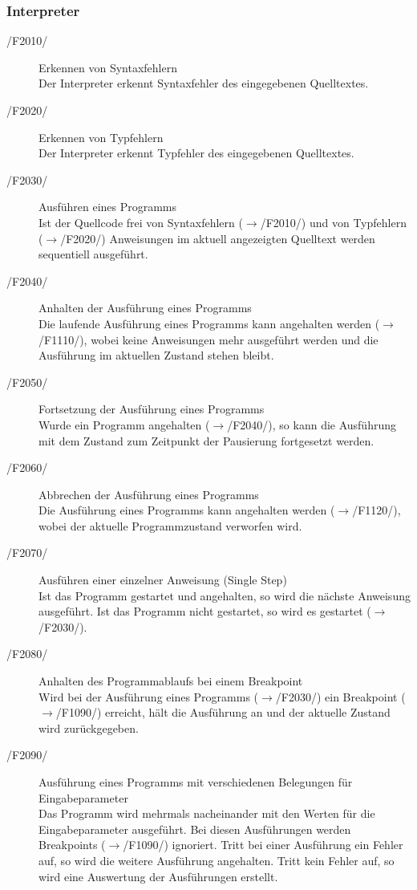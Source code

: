\documentclass[a4paper,10pt]{article}
\begin{document}
\subsubsection{Interpreter}
\begin{description}
\item[/F2010/] Erkennen von Syntaxfehlern\\
Der Interpreter erkennt Syntaxfehler des eingegebenen Quelltextes.
\item[/F2020/] Erkennen von Typfehlern\\
Der Interpreter erkennt Typfehler des eingegebenen Quelltextes.
\item[/F2030/] Ausf\"{u}hren eines Programms\\
Ist der Quellcode frei von Syntaxfehlern ($\to$/F2010/) und von Typfehlern ($\to$/F2020/) Anweisungen im aktuell angezeigten Quelltext werden sequentiell ausgef\"{u}hrt.
\item[/F2040/] Anhalten der Ausführung eines Programms\\
Die laufende Ausführung eines Programms kann angehalten werden ($\to$/F1110/), wobei keine Anweisungen mehr ausgeführt werden und die Ausführung im aktuellen Zustand stehen bleibt.
\item[/F2050/] Fortsetzung der Ausführung eines Programms\\
Wurde ein Programm angehalten ($\to$/F2040/), so kann die Ausführung mit dem Zustand zum Zeitpunkt der Pausierung fortgesetzt werden.
\item[/F2060/] Abbrechen der Ausführung eines Programms\\
Die Ausführung eines Programms kann angehalten werden ($\to$/F1120/), wobei der aktuelle Programmzustand verworfen wird.
\item[/F2070/] Ausführen einer einzelner Anweisung (Single Step)\\
Ist das Programm gestartet und angehalten, so wird die nächste Anweisung ausgeführt. Ist das Programm nicht gestartet, so wird es gestartet ($\to$/F2030/).
\item[/F2080/] Anhalten des Programmablaufs bei einem Breakpoint\\
Wird bei der Ausführung eines Programms ($\to$/F2030/) ein Breakpoint ($\to$/F1090/) erreicht, hält die Ausführung an und der aktuelle Zustand wird zurückgegeben.
\item[/F2090/] Ausführung eines Programms mit verschiedenen Belegungen für Eingabeparameter\\
Das Programm wird mehrmals nacheinander mit den Werten für die Eingabeparameter ausgeführt. Bei diesen Ausführungen werden Breakpoints ($\to$/F1090/) ignoriert. Tritt bei einer Ausführung ein Fehler auf, so wird die weitere Ausführung angehalten. Tritt kein Fehler auf, so wird eine Auswertung der Ausführungen erstellt.

\end{description}
\end{document}

